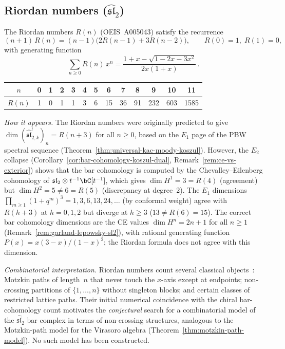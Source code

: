 \subsection{Riordan numbers ($\widehat{\mathfrak{sl}}_2$)}
\label{subsec:riordan}

The Riordan numbers $R(n)$ (OEIS~A005043) satisfy the recurrence
\begin{equation}\label{eq:riordan-recurrence}
(n+1)\,R(n) = (n-1)\bigl(2R(n-1) + 3R(n-2)\bigr),
\qquad R(0) = 1,\; R(1) = 0,
\end{equation}
with generating function
\begin{equation}\label{eq:riordan-gf}
\sum_{n \geq 0} R(n)\,x^n
= \frac{1 + x - \sqrt{1-2x-3x^2}}{2x(1+x)}\,.
\end{equation}

\begin{center}
\renewcommand{\arraystretch}{1.2}
\begin{tabular}{c|cccccccccccc}
$n$ & 0 & 1 & 2 & 3 & 4 & 5 & 6 & 7 & 8 & 9 & 10 & 11 \\
\hline
$R(n)$ & 1 & 0 & 1 & 1 & 3 & 6 & 15 & 36 & 91 & 232 & 603 & 1585
\end{tabular}
\end{center}

\emph{How it appears.}
The Riordan numbers were originally predicted to give
$\dim(\widehat{\mathfrak{sl}}_{2,k}^!)_n = R(n+3)$ for all
$n \geq 0$, based on the $E_1$ page of the PBW spectral
sequence (Theorem~\ref{thm:universal-kac-moody-koszul}).
However, the $E_2$ collapse
(Corollary~\ref{cor:bar-cohomology-koszul-dual},
Remark~\ref{rem:ce-vs-exterior}) shows that the bar
cohomology is computed by the Chevalley--Eilenberg
cohomology of $\mathfrak{sl}_2 \otimes t^{-1}\bC[t^{-1}]$,
which gives $\dim H^1 = 3 = R(4)$ (agreement) but
$\dim H^2 = 5 \neq 6 = R(5)$ (discrepancy at degree~$2$).
The $E_1$ dimensions
$\prod_{m \geq 1}(1+q^m)^3 = 1, 3, 6, 13, 24, \ldots$
(by conformal weight) agree with $R(h+3)$ at
$h = 0, 1, 2$ but diverge at $h \geq 3$
($13 \neq R(6) = 15$).
The correct bar cohomology dimensions are the CE values
$\dim H^n = 2n+1$ for all $n \geq 1$
(Remark~\ref{rem:garland-lepowsky-sl2}),
with rational generating function
$P(x) = x(3{-}x)/(1{-}x)^2$;
the Riordan formula does not agree with this dimension.

\emph{Combinatorial interpretation.}
Riordan numbers count several classical objects~\cite{BernhartRiordan}: Motzkin paths of length~$n$ that never touch the $x$-axis except at endpoints; non-crossing partitions of $\{1, \ldots, n\}$ without singleton blocks; and certain classes of restricted lattice paths. Their initial numerical coincidence with the chiral bar-cohomology count motivates the \emph{conjectural} search for a combinatorial model of the $\widehat{\mathfrak{sl}}_2$ bar complex in terms of non-crossing structures, analogous to the Motzkin-path model for the Virasoro algebra (Theorem~\ref{thm:motzkin-path-model}). No such model has been constructed.

